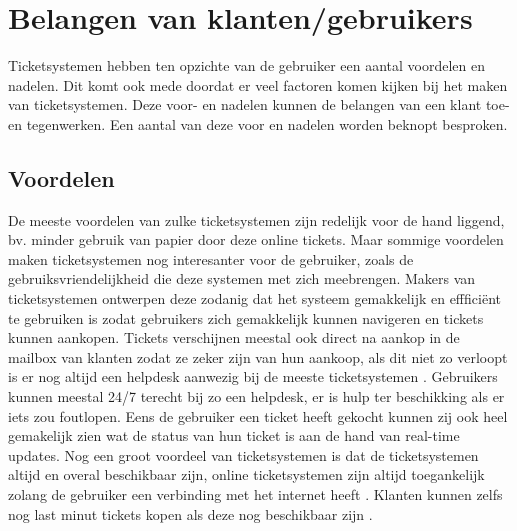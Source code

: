
\section{Belangen van klanten/gebruikers}
Ticketsystemen hebben ten opzichte van de gebruiker een aantal voordelen en nadelen. Dit komt ook mede doordat er veel factoren komen kijken bij het maken van ticketsystemen. 
Deze voor- en nadelen kunnen de belangen van een klant toe- en tegenwerken. Een aantal van deze voor en nadelen worden beknopt besproken. 

\subsection{Voordelen}
De meeste voordelen van zulke ticketsystemen zijn redelijk voor de hand liggend, bv. minder gebruik van papier door deze online tickets.
Maar sommige voordelen maken ticketsystemen nog interesanter voor de gebruiker, zoals de gebruiksvriendelijkheid die deze systemen met zich meebrengen.
Makers van ticketsystemen ontwerpen deze zodanig dat het systeem gemakkelijk en effficiënt te gebruiken is zodat gebruikers zich gemakkelijk kunnen navigeren en tickets kunnen aankopen.
Tickets verschijnen meestal ook direct na aankop in de mailbox van klanten zodat ze zeker zijn van hun aankoop, als dit niet zo verloopt is er nog 
altijd een helpdesk aanwezig bij de meeste ticketsystemen \cite{cm-voordelen}. Gebruikers kunnen meestal 24/7 terecht bij zo een helpdesk, er is hulp ter beschikking als er iets zou foutlopen.
Eens de gebruiker een ticket heeft gekocht kunnen zij ook heel gemakelijk zien wat de status van hun ticket is aan de hand van real-time updates.
Nog een groot voordeel van ticketsystemen is dat de ticketsystemen altijd en overal beschikbaar zijn, online ticketsystemen zijn altijd toegankelijk zolang de gebruiker een verbinding met het internet heeft \cite{Benefitsonline2023}.
Klanten kunnen zelfs nog last minut tickets kopen als deze nog beschikbaar zijn \cite{cm-voordelen}.

